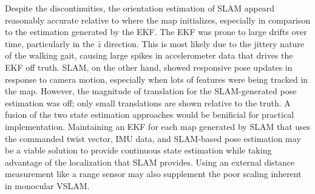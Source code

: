 Despite the discontinuities, the orientation estimation of SLAM appeard reasonably accurate relative to where the map initializes, especially in comparison to the estimation generated by the EKF. The EKF was prone to large drifts over time, particularly in the $\hat{z}$ direction. This is most likely due to the jittery nature of the walking gait, causing large spikes in accelerometer data that drives the EKF off truth. SLAM, on the other hand, showed responsive pose updates in response to camera motion, especially when lots of features were being tracked in the map. However, the magnitude of translation for the SLAM-generated pose estimation was off; only small translations are shown relative to the truth. A fusion of the two state estimation approaches would be benificial for practical implementation. Maintaining an EKF for each map generated by SLAM that uses the commanded twist vector, IMU data, and SLAM-based pose estimation may be a viable solution to provide continuous state estimation while taking advantage of the localization that SLAM provides. Using an external distance measurement like a range sensor may also supplement the poor scaling inherent in monocular VSLAM. 